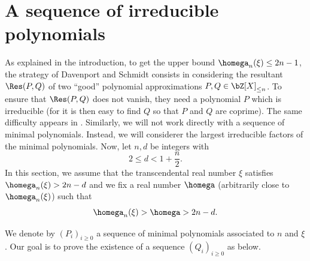 \section{A sequence of irreducible polynomials}
\label{section: sequence des Q_i}

As explained in the introduction, to get the upper bound $\homega_n(\xi) \leq 2n-1$, the strategy of Davenport and Schmidt \cite{davenport1969approximation} consists in considering the resultant $\Res(P,Q)$ of two ``good'' polynomial approximations $P,Q\in \bZ[X]_{\leq n}$. To ensure that $\Res(P,Q)$ does not vanish, they need a polynomial $P$ which is irreducible (for it is then easy to find $Q$ so that $P$ and $Q$ are coprime). The same difficulty appears in \cite{bugeaudSchleischitz2016Uniform}. Similarly, we will not work directly with a sequence of minimal polynomials. Instead, we will considerer the largest irreducible factors of the minimal polynomials. Now, let $n,d$ be integers with
\[
2\leq d < 1+ \frac{n}{2}.
\]
In this section, we assume that the transcendental real number $\xi$ satisfies $\homega_n(\xi) > 2n -d$ and we fix a real number $\homega$ (arbitrarily close to $\homega_n(\xi)$) such that
\begin{equation}
\label{eq: notation homega}
\homega_n(\xi) > \homega > 2n -d.
\end{equation}

We denote by $(P_i)_{i\geq 0}$ a sequence of minimal polynomials associated to $n$ and $\xi$. Our goal is to prove the existence of a sequence $(Q_i)_{i\geq 0}$ as below.

